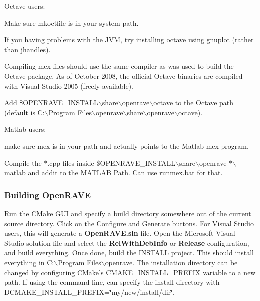 Octave users:
\begin{DoxyItemize}
\item Make sure {\ttfamily mkoctfile} is in your system path.
\item If you having problems with the JVM, try installing octave using gnuplot (rather than jhandles).
\item Compiling mex files should use the same compiler as was used to build the Octave package. As of October 2008, the official Octave binaries are compiled with Visual Studio 2005 (freely available).
\item Add {\ttfamily \$OPENRAVE\_\-INSTALL$\backslash$share$\backslash$openrave$\backslash$octave} to the Octave path (default is {\ttfamily C:$\backslash$Program Files$\backslash$openrave$\backslash$share$\backslash$openrave$\backslash$octave}).
\end{DoxyItemize}

Matlab users:
\begin{DoxyItemize}
\item make sure {\ttfamily mex} is in your path and actually points to the Matlab {\ttfamily mex} program.
\item Compile the $\ast$.cpp files inside {\ttfamily \$OPENRAVE\_\-INSTALL$\backslash$share$\backslash$openrave-\/$\ast$$\backslash$matlab} and addit to the MATLAB Path. Can use runmex.bat for that.
\end{DoxyItemize}\hypertarget{installation__windows_iwin_building}{}\subsubsection{Building OpenRAVE}\label{installation__windows_iwin_building}
Run the {\ttfamily CMake} GUI and specify a build directory somewhere out of the current source directory. Click on the Configure and Generate buttons. For Visual Studio users, this will generate a {\bfseries OpenRAVE.sln} file. Open the Microsoft Visual Studio solution file and select the {\bfseries RelWithDebInfo} or {\bfseries Release} configuration, and build everything. Once done, build the INSTALL project. This should install everything in {\ttfamily C:$\backslash$Program Files$\backslash$openrave}. The installation directory can be changed by configuring {\ttfamily CMake's} CMAKE\_\-INSTALL\_\-PREFIX variable to a new path. If using the command-\/line, can specify the install directory with {\ttfamily -\/DCMAKE\_\-INSTALL\_\-PREFIX=\char`\"{}my/new/install/dir\char`\"{}}.

